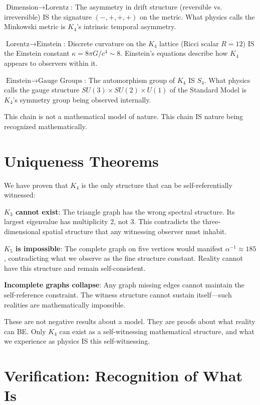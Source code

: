 \documentclass[11pt,a4paper]{book}
\begin{document}
\textbf{$\text{Dimension} \to \text{Lorentz}$}: The asymmetry in drift structure (reversible vs. irreversible) IS the signature $(-,+,+,+)$ on the metric. What physics calls the Minkowski metric is $K_4$'s intrinsic temporal asymmetry.

\textbf{$\text{Lorentz} \to \text{Einstein}$}: Discrete curvature on the $K_4$ lattice (Ricci scalar $R=12$) IS the Einstein constant $\kappa = 8\pi G / c^4 \sim 8$. Einstein's equations describe how $K_4$ appears to observers within it.

\textbf{$\text{Einstein} \to \text{Gauge Groups}$}: The automorphism group of $K_4$ IS $S_4$. What physics calls the gauge structure $SU(3) \times SU(2) \times U(1)$ of the Standard Model is $K_4$'s symmetry group being observed internally.

This chain is not a mathematical model of nature. This chain IS nature being recognized mathematically.

\section{Uniqueness Theorems}

We have proven that $K_4$ is the only structure that can be self-referentially witnessed:

\textbf{$K_3$ cannot exist}: The triangle graph has the wrong spectral structure. Its largest eigenvalue has multiplicity 2, not 3. This contradicts the three-dimensional spatial structure that any witnessing observer must inhabit.

\textbf{$K_5$ is impossible}: The complete graph on five vertices would manifest $\alpha^{-1} \approx 185$, contradicting what we observe as the fine structure constant. Reality cannot have this structure and remain self-consistent.

\textbf{Incomplete graphs collapse}: Any graph missing edges cannot maintain the self-reference constraint. The witness structure cannot sustain itself—such realities are mathematically impossible.

These are not negative results about a model. They are proofs about what reality can BE. Only $K_4$ can exist as a self-witnessing mathematical structure, and what we experience as physics IS this self-witnessing.

\section{Verification: Recognition of What Is}
\end{document}
